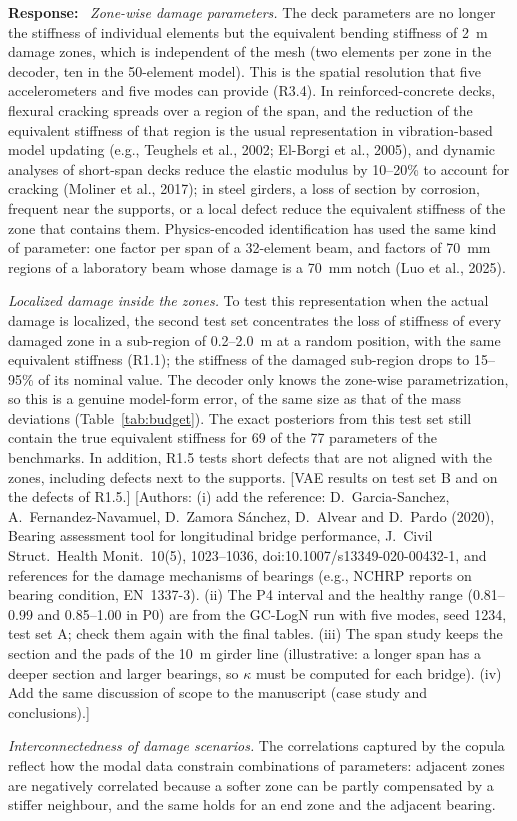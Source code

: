 \documentclass[11pt]{article}
\newenvironment{response}{\par\smallskip\noindent\color{resp}\textbf{Response:}\ }{\par}
\newcommand{\authornote}[1]{\textcolor{note}{\textsf{[Authors: #1]}}}
\newcommand{\tbd}[1]{\textcolor{note}{\textsf{[#1]}}}
\begin{document}
\begin{response}
\textit{Zone-wise damage parameters.} The deck parameters are no longer the stiffness of individual elements but the
equivalent bending stiffness of 2~m damage zones, which is independent of the mesh (two elements per zone in the
decoder, ten in the 50-element model). This is the spatial resolution that five accelerometers and five modes can
provide (R3.4). In reinforced-concrete decks, flexural cracking spreads over a region of the span, and the reduction of
the equivalent stiffness of that region is the usual representation in vibration-based model updating (e.g., Teughels
et al., 2002; El-Borgi et al., 2005), and dynamic analyses of short-span decks reduce the elastic modulus by 10--20\% to
account for cracking (Moliner et al., 2017); in steel girders, a loss of section by corrosion, frequent near the supports, or a local defect reduce
the equivalent stiffness of the zone that contains them. Physics-encoded identification has used the same kind of
parameter: one factor per span of a 32-element beam, and factors of 70~mm regions of a laboratory beam whose damage is a 70~mm
notch (Luo et al., 2025).

\textit{Localized damage inside the zones.} To test this representation when the actual damage is localized, the second
test set concentrates the loss of stiffness of every damaged zone in a sub-region of 0.2--2.0~m at a random position,
with the same equivalent stiffness (R1.1); the stiffness of the damaged sub-region drops to 15--95\% of its nominal value.
The decoder only knows the zone-wise parametrization, so this is a genuine model-form error, of the same size as that of
the mass deviations (Table~\ref{tab:budget}). The exact posteriors from this test set still contain the true equivalent
stiffness for 69 of the 77 parameters of the benchmarks. In addition, R1.5 tests short defects that are not aligned with
the zones, including defects next to the supports.
\tbd{VAE results on test set B and on the defects of R1.5.}
\authornote{(i) add the reference: D.~Garcia-Sanchez, A.~Fernandez-Navamuel, D.~Zamora S\'anchez, D.~Alvear and
D.~Pardo (2020), Bearing assessment tool for longitudinal bridge performance, J.\ Civil Struct.\ Health Monit.\ 10(5),
1023--1036, doi:10.1007/s13349-020-00432-1, and references for the damage mechanisms of bearings (e.g., NCHRP reports on
bearing condition, EN~1337-3). (ii) The P4 interval and the healthy range (0.81--0.99 and 0.85--1.00 in P0) are from the
GC-LogN run with five modes, seed 1234, test set A; check them again with the final tables.
(iii) The span study keeps the section and the pads of the 10~m girder line (illustrative: a longer span has a deeper
section and larger bearings, so $\kappa$ must be computed for each bridge). (iv) Add the same discussion of scope to the manuscript (case study and conclusions).}

\textit{Interconnectedness of damage scenarios.} The correlations captured by the copula reflect how the modal data
constrain combinations of parameters: adjacent zones are negatively correlated because a softer zone can be partly
compensated by a stiffer neighbour, and the same holds for an end zone and the adjacent bearing.
\end{response}
\end{document}
